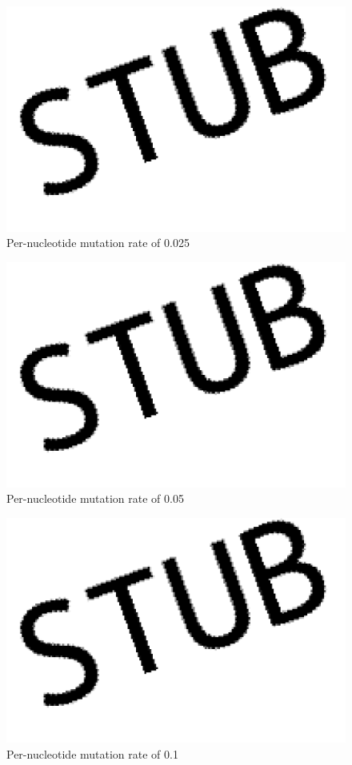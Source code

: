 \begin{figure}[H]
  \includegraphics[width=\textwidth]{pirouette_example_24/example_24/315/errors.png}
  \caption{Per-nucleotide mutation rate of 0.025}
\end{figure}

\begin{figure}[H]
  \includegraphics[width=\textwidth]{pirouette_example_24/example_24/316/errors.png}
  \caption{Per-nucleotide mutation rate of 0.05}
\end{figure}

\begin{figure}[H]
  \includegraphics[width=\textwidth]{pirouette_example_24/example_24/317/errors.png}
  \caption{Per-nucleotide mutation rate of 0.1}
\end{figure}

